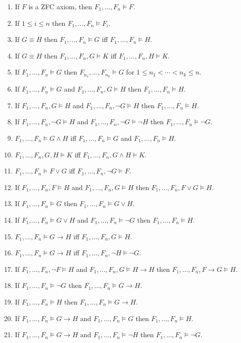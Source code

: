 \documentclass[11pt]{book}
\newcommand{\env}[2]{\begin{#1}#2\end{#1}}
\begin{document}
\env{enumerate}{
	\item If $F$ is a ZFC axiom, then $F_1,\dots,F_n\vDash F$.
	\item If $1\le i\le n$ then $F_1,\dots,F_n\vDash F_i$.
	\item If $G\equiv H$ then $F_1,\dots,F_n\vDash G$ iff $F_1,\dots,F_n\vDash H$.
	\item If $G\equiv H$ then $F_1,\dots,F_n,G\vDash K$ iff $F_1,\dots,F_n,H\vDash K$.
	\item If $F_1,\dots,F_n\vDash G$ then $F_{n_1},\dots,F_{n_k}\vDash G$ for $1\le n_1<\cdots<n_k\le n$.
	\item If $F_1,\dots,F_n\vDash G$ and $F_1,\dots,F_n,G\vDash H$ then $F_1,\dots,F_n\vDash H$.
	\item If $F_1,\dots,F_n,G\vDash H$ and $F_1,\dots,F_n,\neg G\vDash H$ then $F_1,\dots,F_n\vDash H$.
	\item If $F_1,\dots,F_n,\neg G\vDash H$ and $F_1,\dots,F_n,\neg G\vDash \neg H$ then $F_1,\dots,F_n\vDash \neg G$.
	\item $F_1,\dots,F_n\vDash G\land H$ iff $F_1,\dots,F_n\vDash G$ and $F_1,\dots,F_n\vDash H$.
	\item $F_1,\dots,F_n,G,H\vDash K$ iff $F_1,\dots, F_n,G\land H\vDash K$.
	\item $F_1,\dots,F_n\vDash F\lor G$ iff $F_1,\dots,F_n,\neg G\vDash F$.
	\item If $F_1,\dots,F_n,F\vDash H$ and $F_1,\dots,F_n,G\vDash H$ then $F_1,\dots,F_n,F\lor G\vDash H$.
	\item If $F_1,\dots,F_n\vDash G$ then $F_1,\dots,F_n\vDash G\lor H$.
	\item If $F_1,\dots,F_n\vDash G\lor H$ and $F_1,\dots,F_n\vDash \neg G$ then $F_1,\dots,F_n\vDash H$.
	\item $F_1,\dots,F_n\vDash G\rightarrow H$ iff $F_1,\dots,F_n,G\vDash H$.
	\item $F_1,\dots,F_n\vDash G\rightarrow H$ iff $F_1,\dots,F_n,\neg H\vDash \neg G$.
	\item If $F_1,\dots,F_n,\neg F\vDash H$ and $F_1,\dots,F_n,G\vDash H\rightarrow H$ then $F_1,\dots,F_n,F\rightarrow G\vDash H$.
	\item If $F_1,\dots,F_n\vDash \neg G$ then $F_1,\dots,F_n\vDash G\rightarrow H$.
	\item If $F_1,\dots,F_n\vDash H$ then $F_1,\dots,F_n\vDash G\rightarrow H$.
	\item If $F_1,\dots,F_n\vDash G\rightarrow H$ and $F_1,\dots,F_n\vDash G$ then $F_1,\dots,F_n\vDash H$.
	\item If $F_1,\dots,F_n\vDash G\rightarrow H$ and $F_1,\dots,F_n\vDash \neg H$ then $F_1,\dots,F_n\vDash \neg G$.
}
\end{document}

